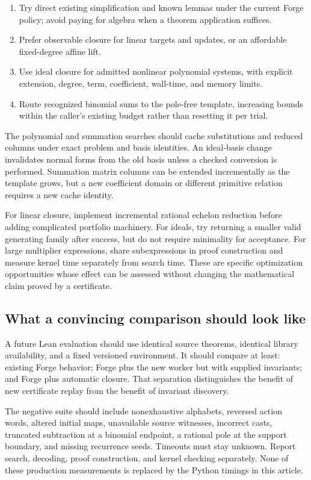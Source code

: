 \begin{enumerate}
\item Try direct existing simplification and known lemmas under the current
Forge policy; avoid paying for algebra when a theorem application suffices.
\item Prefer observable closure for linear targets and updates, or an affordable
fixed-degree affine lift.
\item Use ideal closure for admitted nonlinear polynomial systems, with explicit
extension, degree, term, coefficient, wall-time, and memory limits.
\item Route recognized binomial sums to the pole-free template, increasing
bounds within the caller's existing budget rather than resetting it per trial.
\end{enumerate}

The polynomial and summation searches should cache substitutions and reduced
columns under exact problem and basis identities. An ideal-basis change
invalidates normal forms from the old basis unless a checked conversion is
performed. Summation matrix columns can be extended incrementally as the
template grows, but a new coefficient domain or different primitive relation
requires a new cache identity.

For linear closure, implement incremental rational echelon reduction before
adding complicated portfolio machinery. For ideals, try returning a smaller
valid generating family after success, but do not require minimality for
acceptance. For large multiplier expressions, share subexpressions in proof
construction and measure kernel time separately from search time. These are
specific optimization opportunities whose effect can be assessed without
changing the mathematical claim proved by a certificate.

\subsection{What a convincing comparison should look like}

A future Lean evaluation should use identical source theorems, identical library
availability, and a fixed versioned environment. It should compare at least:
existing Forge behavior; Forge plus the new worker but with supplied invariants;
and Forge plus automatic closure. That separation distinguishes the benefit of
new certificate replay from the benefit of invariant discovery.

The negative suite should include nonexhaustive alphabets, reversed action
words, altered initial maps, unavailable source witnesses, incorrect casts,
truncated subtraction at a binomial endpoint, a rational pole at the support
boundary, and missing recurrence seeds. Timeouts must stay unknown. Report
search, decoding, proof construction, and kernel checking separately. None of
these production measurements is replaced by the Python timings in this
article.


